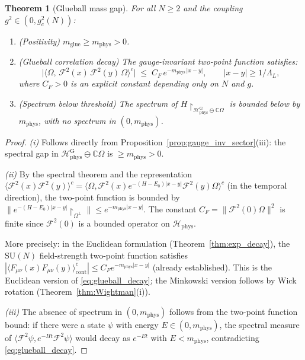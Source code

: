 \documentclass[11pt,a4paper]{amsart}
\newtheorem{theorem}{Theorem}[section]
\theoremstyle{definition}
\newcommand{\SU}{\mathrm{SU}}
\newcommand{\C}{\mathbb{C}}
\begin{document}
\begin{theorem}[Glueball mass gap]
\label{thm:glueball_mass}
For all $N \ge 2$ and the coupling $g^2 \in (0,g^2_c(N))$:
\begin{enumerate}[label=(\roman*)]
\item \emph{(Positivity)} $m_{\mathrm{glue}} \ge m_{\mathrm{phys}} > 0$.
\item \emph{(Glueball correlation decay)}
      The gauge-invariant two-point function satisfies:
      \begin{equation}
      \label{eq:glueball_decay}
        \bigl|\langle\Omega,\,\mathcal{F}^2(x)\,\mathcal{F}^2(y)\,\Omega\rangle^c\bigr|
        \;\le\; C_F\,e^{-m_{\mathrm{phys}}\,|x-y|},
        \qquad |x-y| \ge 1/\Lambda_L,
      \end{equation}
      where $C_F > 0$ is an explicit constant depending only on $N$ and $g$.
\item \emph{(Spectrum below threshold)}
      The spectrum of $H\restriction_{\mathcal{H}_{\mathrm{phys}}^{\mathrm{G}}
      \ominus \C\Omega}$ is bounded below by $m_{\mathrm{phys}}$,
      with no spectrum in $(0,m_{\mathrm{phys}})$.
\end{enumerate}
\end{theorem}
\begin{proof}
\emph{(i)} Follows directly from Proposition~\ref{prop:gauge_inv_sector}(iii):
the spectral gap in $\mathcal{H}_{\mathrm{phys}}^{\mathrm{G}} \ominus \C\Omega$
is $\ge m_{\mathrm{phys}} > 0$.

\emph{(ii)} By the spectral theorem and the representation
$\langle\mathcal{F}^2(x)\mathcal{F}^2(y)\rangle^c = \langle\Omega,
\mathcal{F}^2(x) e^{-(H-E_0)|x-y|} \mathcal{F}^2(y)\Omega\rangle^c$
(in the temporal direction), the two-point function is bounded by
$\|e^{-(H-E_0)|x-y|}\restriction_{\Omega^\perp}\| \le e^{-m_{\mathrm{phys}}|x-y|}$.
The constant $C_F = \|\mathcal{F}^2(0)\Omega\|^2$ is finite since
$\mathcal{F}^2(0)$ is a bounded operator on $\mathcal{H}_{\mathrm{phys}}$.

More precisely: in the Euclidean formulation (Theorem~\ref{thm:exp_decay}),
the $\SU(N)$ field-strength two-point function satisfies
$|\langle F_{\mu\nu}(x)F_{\mu\nu}(y)\rangle^c_{\mathrm{cont}}|
\le C_F e^{-m_{\mathrm{phys}}|x-y|}$ (already established).
This is the Euclidean version of \eqref{eq:glueball_decay};
the Minkowski version follows by Wick rotation (Theorem~\ref{thm:Wightman}(i)).

\emph{(iii)} The absence of spectrum in $(0, m_{\mathrm{phys}})$ follows from
the two-point function bound: if there were a state $\psi$ with energy
$E \in (0, m_{\mathrm{phys}})$, the spectral measure of
$\langle \mathcal{F}^2 \psi, e^{-Ht} \mathcal{F}^2 \psi\rangle$ would decay
as $e^{-Et}$ with $E < m_{\mathrm{phys}}$, contradicting \eqref{eq:glueball_decay}.
\end{proof}
\end{document}
